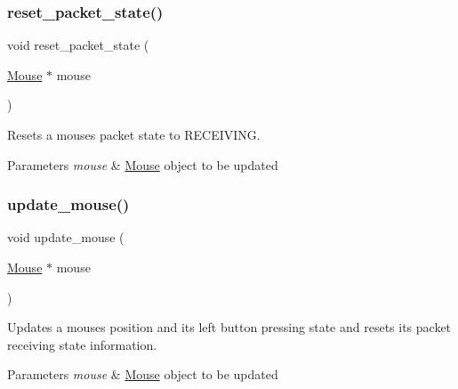 \subsubsection{\texorpdfstring{reset\+\_\+packet\+\_\+state()}{reset\_packet\_state()}}
{\footnotesize\ttfamily void reset\+\_\+packet\+\_\+state (\begin{DoxyParamCaption}\item[{\hyperlink{struct_mouse}{Mouse} $\ast$}]{mouse }\end{DoxyParamCaption})}



Resets a mouse\textquotesingle{}s packet state to R\+E\+C\+E\+I\+V\+I\+NG. 


\begin{DoxyParams}{Parameters}
{\em mouse} & \hyperlink{struct_mouse}{Mouse} \textquotesingle{}object\textquotesingle{} to be updated \\
\hline
\end{DoxyParams}
\hypertarget{group__mouse_ga89d5f7399006fac6c3e5e0300bd34869}{}\label{group__mouse_ga89d5f7399006fac6c3e5e0300bd34869} 
\subsubsection{\texorpdfstring{update\+\_\+mouse()}{update\_mouse()}}
{\footnotesize\ttfamily void update\+\_\+mouse (\begin{DoxyParamCaption}\item[{\hyperlink{struct_mouse}{Mouse} $\ast$}]{mouse }\end{DoxyParamCaption})}



Updates a mouse\textquotesingle{}s position and its left button pressing state and resets its packet receiving state information. 


\begin{DoxyParams}{Parameters}
{\em mouse} & \hyperlink{struct_mouse}{Mouse} \textquotesingle{}object\textquotesingle{} to be updated \\
\hline
\end{DoxyParams}
